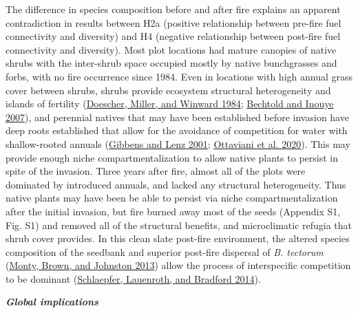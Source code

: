 \documentclass[
  12pt,
]{article}
\begin{document}
The difference in species composition before and after fire explains an
apparent contradiction in results between H2a (positive relationship
between pre-fire fuel connectivity and diversity) and H4 (negative
relationship between post-fire fuel connectivity and diversity). Most
plot locations had mature canopies of native shrubs with the inter-shrub
space occupied mostly by native bunchgrasses and forbs, with no fire
occurrence since 1984. Even in locations with high annual grass cover
between shrubs, shrubs provide ecosystem structural heterogeneity and
islands of fertility (\protect\hyperlink{ref-Doescher1984}{Doescher,
Miller, and Winward 1984}; \protect\hyperlink{ref-Bechtold2007}{Bechtold
and Inouye 2007}), and perennial natives that may have been established
before invasion have deep roots established that allow for the avoidance
of competition for water with shallow-rooted annuals
(\protect\hyperlink{ref-Gibbens2001}{Gibbens and Lenz 2001};
\protect\hyperlink{ref-Ottaviani2020}{Ottaviani et al. 2020}). This may
provide enough niche compartmentalization to allow native plants to
persist in spite of the invasion. Three years after fire, almost all of
the plots were dominated by introduced annuals, and lacked any
structural heterogeneity. Thus native plants may have been be able to
persist via niche compartmentalization after the initial invasion, but
fire burned away most of the seeds (Appendix S1, Fig. S1) and removed
all of the structural benefits, and microclimatic refugia that shrub
cover provides. In this clean slate post-fire environment, the altered
species composition of the seedbank and superior post-fire dispersal of
\emph{B. tectorum} (\protect\hyperlink{ref-Monty2013}{Monty, Brown, and
Johnston 2013}) allow the process of interspecific competition to be
dominant (\protect\hyperlink{ref-Schlaepfer2014}{Schlaepfer, Lauenroth,
and Bradford 2014}).

\textbf{\emph{Global implications}}
\end{document}
